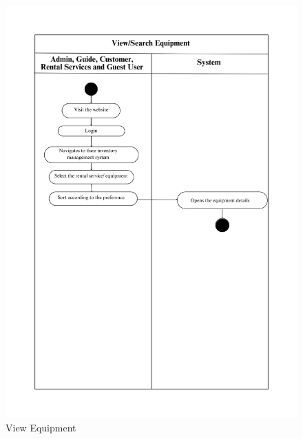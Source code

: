 \begin{figure}[h!]
    \centering
    \includegraphics[width=1\textwidth]{Images/Activity Diagrams/20 View_Search Equipment.png}
    \caption{View Equipment}
    \label{fig:activity-view-equ}
\end{figure}

